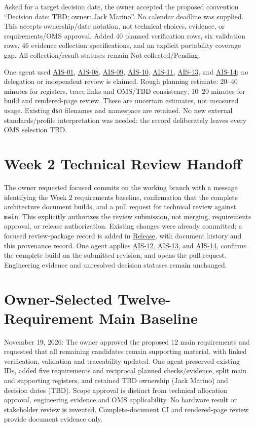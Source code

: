 Asked for a target decision date, the owner accepted the proposed convention
``Decision date: TBD; owner: Jack Marino''. No calendar deadline was supplied.
This accepts ownership/date notation, not technical choices, evidence, or
requirements/OMS approval. Added 40 planned verification rows, six validation
rows, 46 evidence collection specifications, and an explicit portability
coverage gap. All collection/result statuses remain Not collected/Pending.

One agent used \hyperref[Skill:AIS-01]{AIS-01},
\hyperref[Skill:AIS-08]{AIS-08}, \hyperref[Skill:AIS-09]{AIS-09},
\hyperref[Skill:AIS-10]{AIS-10}, \hyperref[Skill:AIS-11]{AIS-11},
\hyperref[Skill:AIS-13]{AIS-13}, and \hyperref[Skill:AIS-14]{AIS-14};
no delegation or independent review is claimed. Rough planning estimate:
20--40 minutes for registers, trace links and OMS/TBD consistency; 10--20
minutes for build and rendered-page review. These are uncertain estimates,
not measured usage. Existing \texttt{dsn} filenames and namespace are retained.
No new external standards/profile interpretation was needed: the record
deliberately leaves every OMS selection TBD.

\section{Week 2 Technical Review Handoff}
\label{Section:WeekTwoReviewPrompt}
The owner requested focused commits on the working branch with a message
identifying the Week 2 requirements baseline, confirmation that the complete
architecture document builds, and a pull request for technical review against
\texttt{main}. This explicitly authorizes the review submission, not merging,
requirements approval, or release authorization. Existing changes were already
committed; a focused review-package record is added in
\hyperref[Section:WeekTwoReviewPackage]{Release}, with document history and
this provenance record. One agent applies
\hyperref[Skill:AIS-12]{AIS-12}, \hyperref[Skill:AIS-13]{AIS-13}, and
\hyperref[Skill:AIS-14]{AIS-14}, confirms the complete build on the submitted
revision, and opens the pull request. Engineering evidence and unresolved
decision statuses remain unchanged.
\section{Owner-Selected Twelve-Requirement Main Baseline}
November 19, 2026: The owner approved the proposed 12 main requirements and requested that all remaining candidates remain supporting material, with linked verification, validation and traceability updated. One agent preserved existing IDs, added five requirements and reciprocal planned checks/evidence, split main and supporting registers, and retained TBD ownership (Jack Marino) and decision dates (TBD). Scope approval is distinct from technical allocation approval, engineering evidence and OMS applicability. No hardware result or stakeholder review is invented. Complete-document CI and rendered-page review provide document evidence only.
